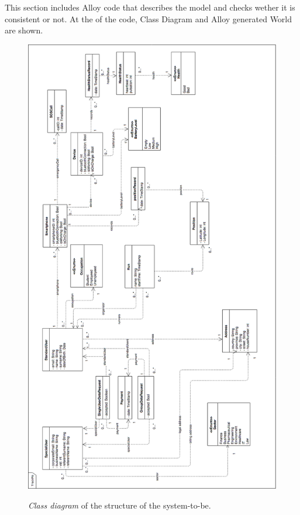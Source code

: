 This section includes Alloy code that describes the model and checks wether it is consistent or not.
At the of the code, Class Diagram and Alloy generated World are shown.



\vfill

\begin{figure}[H]
  \begin{center}
  	\includegraphics[height=0.68\paperheight]{./img/Class_Diagram.png}
		\caption{\textit{Class diagram} of the structure of the system-to-be.}
    \hspace{0.05\linewidth}
    \centering
		\label{classDiagram}
    \end{center}
\end{figure}
